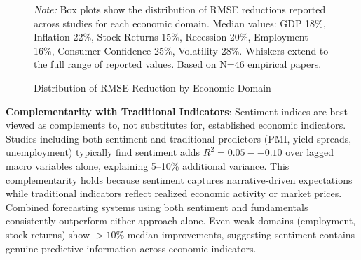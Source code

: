 \documentclass[11pt]{article}
\begin{document}
\begin{figure}[htbp]
\centering
\caption{Distribution of RMSE Reduction by Economic Domain}
\label{fig:performance_dist}
\raggedright\footnotesize
\textit{Note:} Box plots show the distribution of RMSE reductions reported across studies for each economic domain. Median values: GDP 18\%, Inflation 22\%, Stock Returns 15\%, Recession 20\%, Employment 16\%, Consumer Confidence 25\%, Volatility 28\%. Whiskers extend to the full range of reported values. Based on N=46 empirical papers.
\end{figure}

\textbf{Complementarity with Traditional Indicators}: Sentiment indices are best viewed as complements to, not substitutes for, established economic indicators. Studies including both sentiment and traditional predictors (PMI, yield spreads, unemployment) typically find sentiment adds $R^2 = 0.05--0.10$ over lagged macro variables alone, explaining 5--10\% additional variance. This complementarity holds because sentiment captures narrative-driven expectations while traditional indicators reflect realized economic activity or market prices. Combined forecasting systems using both sentiment and fundamentals consistently outperform either approach alone. Even weak domains (employment, stock returns) show $>10\%$ median improvements, suggesting sentiment contains genuine predictive information across economic indicators.
\end{document}
